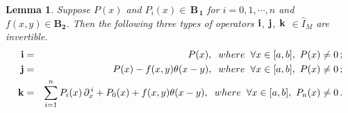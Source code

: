 \documentclass[10pt]{article}
\newcommand{\bea}{\begin{eqnarray}}
\newcommand{\eea}{\end{eqnarray}}
\newcommand{\nn}{\nonumber}
\newcommand{\rd}{\partial}
\newcommand{\mIm}{\widehat{I}_{M}}
\newtheorem{lem}{Lemma}
\begin{document}
{\begin{lem}\label{iraj45}{Suppose $P(x)$ and $P_{i}(x)\in \,\boldsymbol{B_{\,1}}$ for $i=0,1,\cdots,n$ and $f(x,y)\in
\boldsymbol{B_2}$. Then the following three types of operators
$\bf{i}$, $\bf{j}$, $\bf{k}$ $\in \mIm$ are invertible. \bea
{\bf{i}}&=& P(x),\hspace{0.2cm} where \hspace{0.2cm}  \forall
x\in[a,b],\,\, P(x)\ne 0\nn\,;\\
{\bf{j}}&=&P(x)-f(x,y)\theta(x-y),\hspace{0.2cm} where
\hspace{0.2cm} \forall x\in[a,b],\,\, P(x)\ne 0 \nn\,;
\\{\bf{k}}&=&\sum^{n}_{i=1} P_{i}(x) \,\rd_{x}^{\,i}+P_{0}(x)+
f(x,y)\theta(x-y),\hspace{0.2cm} where \hspace{0.2cm} \forall
x\in[a,b],\,\, P_{n}(x)\ne 0\,. \nn\eea}
\end{lem}

}
\end{document}
